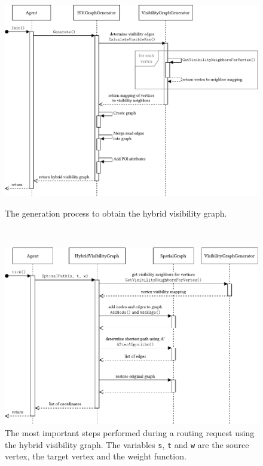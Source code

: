 	\begin{figure}[h]
		\begin{figcenter}
			\includegraphics[scale=0.8]{images/components-sequence-generation.pdf}
		\end{figcenter}
		\caption{The generation process to obtain the hybrid visibility graph.}
		\label{fig:components-sequence-generate}
		\hfill
		\\
		\begin{figcenter}
			\includegraphics[scale=0.8]{images/components-sequence-routing.pdf}
		\end{figcenter}
		\caption{The most important steps performed during a routing request using the hybrid visibility graph. The variables \texttt{s}, \texttt{t} and \texttt{w} are the source vertex, the target vertex and the weight function.}
		\label{fig:components-sequence-routing}
	\end{figure}
	
